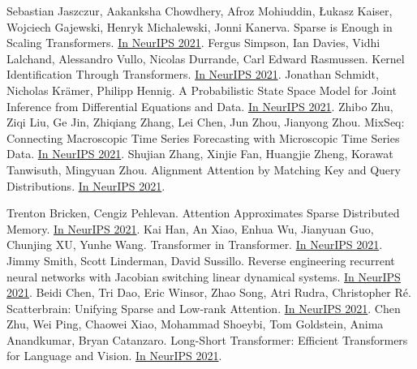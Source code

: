 \documentclass[b5paper,xelatex,ja=standard,10pt]{bxjsarticle}
\begin{document}
\begin{thebibliography}{99}
     Sebastian Jaszczur, Aakanksha Chowdhery, Afroz Mohiuddin, Łukasz Kaiser, Wojciech Gajewski, Henryk Michalewski, Jonni Kanerva. Sparse is Enough in Scaling Transformers. {\href{https://proceedings.neurips.cc/paper/2021/hash/51f15efdd170e6043fa02a74882f0470-Abstract.html}{In NeurIPS 2021}}.
     Fergus Simpson, Ian Davies, Vidhi Lalchand, Alessandro Vullo, Nicolas Durrande, Carl Edward Rasmussen. Kernel Identification Through Transformers. {\href{https://proceedings.neurips.cc/paper/2021/hash/56c3b2c6ea3a83aaeeff35eeb45d700d-Abstract.html}{In NeurIPS 2021}}.
     Jonathan Schmidt, Nicholas Krämer, Philipp Hennig. A Probabilistic State Space Model for Joint Inference from Differential Equations and Data. {\href{https://proceedings.neurips.cc/paper/2021/hash/6734fa703f6633ab896eecbdfad8953a-Abstract.html}{In NeurIPS 2021}}.
     Zhibo Zhu, Ziqi Liu, Ge Jin, Zhiqiang Zhang, Lei Chen, Jun Zhou, Jianyong Zhou. MixSeq: Connecting Macroscopic Time Series Forecasting with Microscopic Time Series Data. {\href{https://proceedings.neurips.cc/paper/2021/hash/6b5754d737784b51ec5075c0dc437bf0-Abstract.html}{In NeurIPS 2021}}.
     Shujian Zhang, Xinjie Fan, Huangjie Zheng, Korawat Tanwisuth, Mingyuan Zhou. Alignment Attention by Matching Key and Query Distributions. {\href{https://proceedings.neurips.cc/paper/2021/hash/6fd6b030c6afec018415662d0db43f9d-Abstract.html}{In NeurIPS 2021}}.

     Trenton Bricken, Cengiz Pehlevan. Attention Approximates Sparse Distributed Memory. {\href{https://proceedings.neurips.cc/paper/2021/hash/8171ac2c5544a5cb54ac0f38bf477af4-Abstract.html}{In NeurIPS 2021}}.
     Kai Han, An Xiao, Enhua Wu, Jianyuan Guo, Chunjing XU, Yunhe Wang. Transformer in Transformer. {\href{https://proceedings.neurips.cc/paper/2021/hash/854d9fca60b4bd07f9bb215d59ef5561-Abstract.html}{In NeurIPS 2021}}.
     Jimmy Smith, Scott Linderman, David Sussillo. Reverse engineering recurrent neural networks with Jacobian switching linear dynamical systems. {\href{https://proceedings.neurips.cc/paper/2021/hash/8b77b4b5156dc11dec152c6c71481565-Abstract.html}{In NeurIPS 2021}}.
     Beidi Chen, Tri Dao, Eric Winsor, Zhao Song, Atri Rudra, Christopher Ré. Scatterbrain: Unifying Sparse and Low-rank Attention. {\href{https://proceedings.neurips.cc/paper/2021/hash/9185f3ec501c674c7c788464a36e7fb3-Abstract.html}{In NeurIPS 2021}}.
     Chen Zhu, Wei Ping, Chaowei Xiao, Mohammad Shoeybi, Tom Goldstein, Anima Anandkumar, Bryan Catanzaro. Long-Short Transformer: Efficient Transformers for Language and Vision. {\href{https://proceedings.neurips.cc/paper/2021/hash/9425be43ba92c2b4454ca7bf602efad8-Abstract.html}{In NeurIPS 2021}}.


\end{thebibliography}
\end{document}
